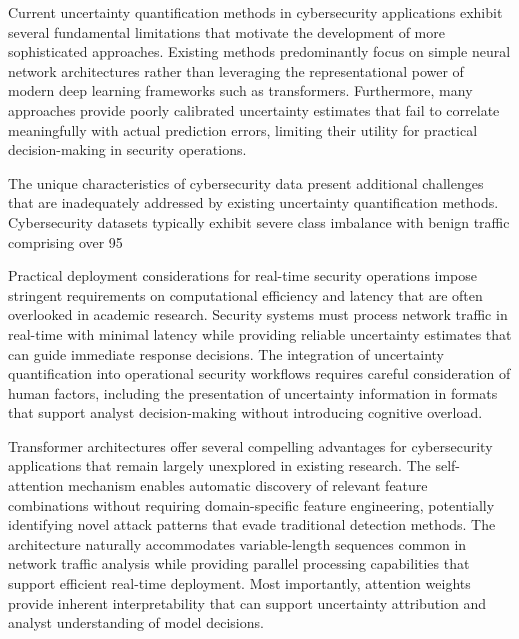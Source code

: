 \documentclass[journal]{IEEEtran}
\begin{document}
Current uncertainty quantification methods in cybersecurity applications exhibit several fundamental limitations that motivate the development of more sophisticated approaches. Existing methods predominantly focus on simple neural network architectures rather than leveraging the representational power of modern deep learning frameworks such as transformers. Furthermore, many approaches provide poorly calibrated uncertainty estimates that fail to correlate meaningfully with actual prediction errors, limiting their utility for practical decision-making in security operations.

The unique characteristics of cybersecurity data present additional challenges that are inadequately addressed by existing uncertainty quantification methods. Cybersecurity datasets typically exhibit severe class imbalance with benign traffic comprising over 95%

Practical deployment considerations for real-time security operations impose stringent requirements on computational efficiency and latency that are often overlooked in academic research. Security systems must process network traffic in real-time with minimal latency while providing reliable uncertainty estimates that can guide immediate response decisions. The integration of uncertainty quantification into operational security workflows requires careful consideration of human factors, including the presentation of uncertainty information in formats that support analyst decision-making without introducing cognitive overload.

Transformer architectures offer several compelling advantages for cybersecurity applications that remain largely unexplored in existing research. The self-attention mechanism enables automatic discovery of relevant feature combinations without requiring domain-specific feature engineering, potentially identifying novel attack patterns that evade traditional detection methods. The architecture naturally accommodates variable-length sequences common in network traffic analysis while providing parallel processing capabilities that support efficient real-time deployment. Most importantly, attention weights provide inherent interpretability that can support uncertainty attribution and analyst understanding of model decisions.
\end{document}
